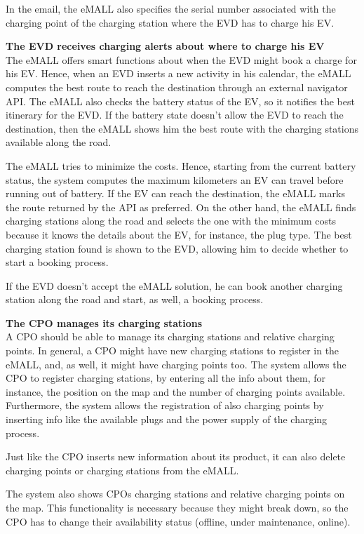In the email, the eMALL also specifies the serial number associated with the charging point of the charging station where the EVD has to charge his EV\@.

\textbf{The EVD receives charging alerts about where to charge his EV} \\
The eMALL offers smart functions about when the EVD might book a charge for his EV\@.
Hence, when an EVD inserts a new activity in his calendar, the eMALL computes the best route to reach the destination through an external navigator API\@.
The eMALL also checks the battery status of the EV, so it notifies the best itinerary for the EVD\@.
If the battery state doesn't allow the EVD to reach the destination, then the eMALL shows him the best route with the charging stations available along the road.

The eMALL tries to minimize the costs.
Hence, starting from the current battery status, the system computes the maximum kilometers an EV can travel before running out of battery.
If the EV can reach the destination, the eMALL marks the route returned by the API as preferred.
On the other hand, the eMALL finds charging stations along the road and selects the one with the minimum costs because it knows the details about the EV, for instance, the plug type.
The best charging station found is shown to the EVD, allowing him to decide whether to start a booking process.

If the EVD doesn't accept the eMALL solution, he can book another charging station along the road and start, as well, a booking process.

\textbf{The CPO manages its charging stations} \\
A CPO should be able to manage its charging stations and relative charging points.
In general, a CPO might have new charging stations to register in the eMALL, and, as well, it might have charging points too.
The system allows the CPO to register charging stations, by entering all the info about them, for instance, the position on the map and the number of charging points available.
Furthermore, the system allows the registration of also charging points by inserting info like the available plugs and the power supply of the charging process.

Just like the CPO inserts new information about its product, it can also delete charging points or charging stations from the eMALL\@.

The system also shows CPOs charging stations and relative charging points on the map.
This functionality is necessary because they might break down, so the CPO has to change their availability status (offline, under maintenance, online).


